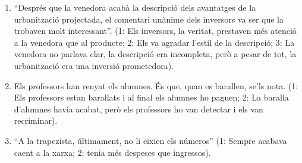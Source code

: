 \begin{enumerate}
\begin{enumerate}
      \item ``Després que la venedora acabà la descripció dels
        avantatges de la urbanització projectada, el comentari unànime
        dels inversors va ser que la trobaven molt interessant''. (1:
        Els inversors, la veritat, prestaven més atenció a la venedora
        que al producte; 2: Els va agradar l'estil de la descripció;
        3: La venedora no parlava clar, la descripció era incompleta,
        però a pesar de tot, la urbanització era una inversió
        prometedora).
      \item Els professors han renyat els alumnes. És que, quan es
        barallen, se'ls nota. (1: Els professors estan barallats i al
        final els alumnes ho paguen; 2: La baralla d'alumnes havia
        acabat, però els professors ho van detectar i els van recriminar).
      \item ``A la trapezista, últimament, no li eixien els números''
        (1: Sempre acabava caent a la xarxa; 2: tenia més despeses que
        ingressos).

\end{enumerate}
\end{enumerate}
